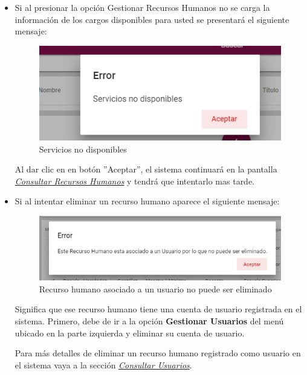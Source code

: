           \begin{itemize}
                \item Si al  presionar la opción Gestionar Recursos Humanos no se carga la información de los cargos disponibles para usted se presentará el siguiente mensaje:

             \begin{figure}[H]
                \centering
                \includegraphics[width=0.4\linewidth]{images/SP1/MSGSN}
                \caption{Servicios no disponibles}
                \label{SND}

            \end{figure}

                    Al dar clic en en botón ''Aceptar'', el sistema continuará en la pantalla  \hyperlink{consultarRH}{\textit{Consultar Recursos Humanos}} y tendrá que intentarlo  mas tarde.


              \item Si al intentar eliminar un recurso humano aparece el siguiente mensaje:
                \begin{figure}[H]
                   \centering
                   \includegraphics[width=0.4\linewidth]{images/SP1/MSG56}
                    \caption{Recurso humano asociado a un usuario no puede ser eliminado}
                   \label{mensaje56}
                \end{figure}

                Significa que ese recurso humano tiene una cuenta de usuario registrada en el sistema. Primero, debe de ir a la opción \textbf{Gestionar Usuarios} del menú ubicado en la parte izquierda y eliminar su cuenta de usuario.

                Para más detalles de eliminar un recurso humano registrado como usuario en el sistema vaya a la sección \hyperlink{consultarUs}{\textit{Consultar Usuarios}}.


           \end{itemize}


